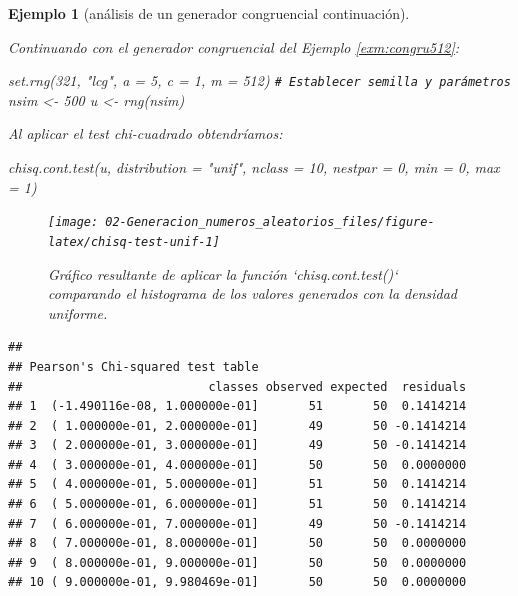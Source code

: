\documentclass[
]{book}
\newenvironment{Shaded}{\begin{snugshade}}{\end{snugshade}}
\newcommand{\AttributeTok}[1]{\textcolor[rgb]{0.77,0.63,0.00}{#1}}
\newcommand{\CommentTok}[1]{\textcolor[rgb]{0.56,0.35,0.01}{\textit{#1}}}
\newcommand{\DecValTok}[1]{\textcolor[rgb]{0.00,0.00,0.81}{#1}}
\newcommand{\FunctionTok}[1]{\textcolor[rgb]{0.00,0.00,0.00}{#1}}
\newcommand{\NormalTok}[1]{#1}
\newcommand{\OtherTok}[1]{\textcolor[rgb]{0.56,0.35,0.01}{#1}}
\newcommand{\StringTok}[1]{\textcolor[rgb]{0.31,0.60,0.02}{#1}}
\theoremstyle{break}
\newtheorem{example}{Ejemplo}[chapter]
\theoremstyle{nonumberplain}
\renewcommand{\CommentTok}[1]{\textcolor[rgb]{0.41,0.41,0.41}{\texttt{#1}}}
\begin{document}
\begin{example}[análisis de un generador congruencial continuación]
\protect\hypertarget{exm:congru512b}{}\label{exm:congru512b}

Continuando con el generador congruencial del Ejemplo \ref{exm:congru512}:

\begin{Shaded}
\begin{Highlighting}[]
\FunctionTok{set.rng}\NormalTok{(}\DecValTok{321}\NormalTok{, }\StringTok{"lcg"}\NormalTok{, }\AttributeTok{a =} \DecValTok{5}\NormalTok{, }\AttributeTok{c =} \DecValTok{1}\NormalTok{, }\AttributeTok{m =} \DecValTok{512}\NormalTok{)  }\CommentTok{\# Establecer semilla y parámetros}
\NormalTok{nsim }\OtherTok{\textless{}{-}} \DecValTok{500}
\NormalTok{u }\OtherTok{\textless{}{-}} \FunctionTok{rng}\NormalTok{(nsim)}
\end{Highlighting}
\end{Shaded}

Al aplicar el test chi-cuadrado obtendríamos:

\begin{Shaded}
\begin{Highlighting}[]
\FunctionTok{chisq.cont.test}\NormalTok{(u, }\AttributeTok{distribution =} \StringTok{"unif"}\NormalTok{, }
                \AttributeTok{nclass =} \DecValTok{10}\NormalTok{, }\AttributeTok{nestpar =} \DecValTok{0}\NormalTok{, }\AttributeTok{min =} \DecValTok{0}\NormalTok{, }\AttributeTok{max =} \DecValTok{1}\NormalTok{)}
\end{Highlighting}
\end{Shaded}

\begin{figure}[!htb]

{\centering \texttt{[image: 02-Generacion\_numeros\_aleatorios\_files/figure-latex/chisq-test-unif-1]} 

}

\caption{Gráfico resultante de aplicar la función `chisq.cont.test()` comparando el histograma de los valores generados con la densidad uniforme.}\label{fig:chisq-test-unif}
\end{figure}

\begin{verbatim}
## 
## Pearson's Chi-squared test table
##                          classes observed expected  residuals
## 1  (-1.490116e-08, 1.000000e-01]       51       50  0.1414214
## 2  ( 1.000000e-01, 2.000000e-01]       49       50 -0.1414214
## 3  ( 2.000000e-01, 3.000000e-01]       49       50 -0.1414214
## 4  ( 3.000000e-01, 4.000000e-01]       50       50  0.0000000
## 5  ( 4.000000e-01, 5.000000e-01]       51       50  0.1414214
## 6  ( 5.000000e-01, 6.000000e-01]       51       50  0.1414214
## 7  ( 6.000000e-01, 7.000000e-01]       49       50 -0.1414214
## 8  ( 7.000000e-01, 8.000000e-01]       50       50  0.0000000
## 9  ( 8.000000e-01, 9.000000e-01]       50       50  0.0000000
## 10 ( 9.000000e-01, 9.980469e-01]       50       50  0.0000000
\end{verbatim}


\end{example}
\end{document}
